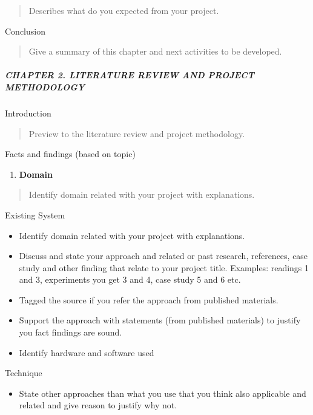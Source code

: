 \documentclass[12pt,a4paper]{article}
\begin{document}
\begin{quote}
Describes what do you expected from your project.
\end{quote}

Conclusion

\begin{quote}
Give a summary of this chapter and next activities to be developed.
\end{quote}

\subparagraph{CHAPTER 2. LITERATURE REVIEW AND PROJECT
METHODOLOGY}\label{chapter-2.-literature-review-and-project-methodology}

Introduction

\begin{quote}
Preview to the literature review and project methodology.
\end{quote}

Facts and findings (based on topic)

\begin{enumerate}
\def\labelenumi{\arabic{enumi}.}
\item
  \textbf{Domain}
\end{enumerate}

\begin{quote}
Identify domain related with your project with explanations.
\end{quote}

Existing System

\begin{itemize}
\item
  Identify domain related with your project with explanations.
\item
  Discuss and state your approach and related or past research,
  references, case study and other finding that relate to your project
  title. Examples: readings 1 and 3, experiments you get 3 and 4, case
  study 5 and 6 etc.
\item
  Tagged the source if you refer the approach from published materials.
\item
  Support the approach with statements (from published materials) to
  justify you fact findings are sound.
\item
  Identify hardware and software used
\end{itemize}

Technique

\begin{itemize}
\item
  State other approaches than what you use that you think also
  applicable and related and give reason to justify why not.
\end{itemize}
\end{document}
